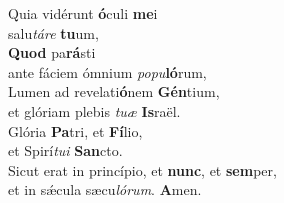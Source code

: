 \evenverse Quia vidérunt \textbf{ó}culi \textbf{me}i~\*\\
\evenverse salu\textit{tá}\textit{re} \textbf{tu}um,\\
\oddverse \textbf{Quod} pa\textbf{rá}sti~\*\\
\oddverse ante fáciem ómnium \textit{po}\textit{pu}\textbf{ló}rum,\\
\evenverse Lumen ad revelati\textbf{ó}nem \textbf{Gén}tium,~\*\\
\evenverse et glóriam plebis \textit{tu}\textit{æ} \textbf{Is}raël.\\
\oddverse Glória \textbf{Pa}tri, et \textbf{Fí}lio,~\*\\
\oddverse et Spirí\textit{tu}\textit{i} \textbf{San}cto.\\
\evenverse Sicut erat in princípio, et \textbf{nunc}, et \textbf{sem}per,~\*\\
\evenverse et in sǽcula sæcu\textit{ló}\textit{rum}. \textbf{A}men.\\
